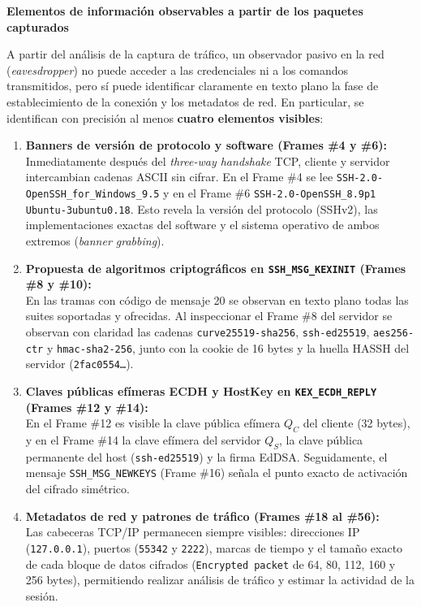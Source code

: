 \documentclass[letter,12pt]{article}
\begin{document}
\vspace{0.3cm}
\noindent\textbf{Elementos de información observables a partir de los paquetes capturados}\par
\vspace{0.15cm}

A partir del análisis de la captura de tráfico, un observador pasivo en la red (\textit{eavesdropper}) no puede acceder a las credenciales ni a los comandos transmitidos, pero sí puede identificar claramente en texto plano la fase de establecimiento de la conexión y los metadatos de red. En particular, se identifican con precisión al menos \textbf{cuatro elementos visibles}:

\begin{enumerate}
    \item \textbf{Banners de versión de protocolo y software (Frames \#4 y \#6):}\\
    Inmediatamente después del \textit{three-way handshake} TCP, cliente y servidor intercambian cadenas ASCII sin cifrar. En el Frame \#4 se lee \texttt{SSH-2.0-OpenSSH\_for\_Windows\_9.5} y en el Frame \#6 \texttt{SSH-2.0-OpenSSH\_8.9p1 Ubuntu-3ubuntu0.18}. Esto revela la versión del protocolo (SSHv2), las implementaciones exactas del software y el sistema operativo de ambos extremos (\textit{banner grabbing}).

    \item \textbf{Propuesta de algoritmos criptográficos en \texttt{SSH\_MSG\_KEXINIT} (Frames \#8 y \#10):}\\
    En las tramas con código de mensaje 20 se observan en texto plano todas las suites soportadas y ofrecidas. Al inspeccionar el Frame \#8 del servidor se observan con claridad las cadenas \texttt{curve25519-sha256}, \texttt{ssh-ed25519}, \texttt{aes256-ctr} y \texttt{hmac-sha2-256}, junto con la cookie de 16 bytes y la huella HASSH del servidor (\texttt{2fac0554\dots}).

    \item \textbf{Claves públicas efímeras ECDH y HostKey en \texttt{KEX\_ECDH\_REPLY} (Frames \#12 y \#14):}\\
    En el Frame \#12 es visible la clave pública efímera $Q_C$ del cliente (32 bytes), y en el Frame \#14 la clave efímera del servidor $Q_S$, la clave pública permanente del host (\texttt{ssh-ed25519}) y la firma EdDSA. Seguidamente, el mensaje \texttt{SSH\_MSG\_NEWKEYS} (Frame \#16) señala el punto exacto de activación del cifrado simétrico.

    \item \textbf{Metadatos de red y patrones de tráfico (Frames \#18 al \#56):}\\
    Las cabeceras TCP/IP permanecen siempre visibles: direcciones IP (\texttt{127.0.0.1}), puertos (\texttt{55342} y \texttt{2222}), marcas de tiempo y el tamaño exacto de cada bloque de datos cifrados (\texttt{Encrypted packet} de 64, 80, 112, 160 y 256 bytes), permitiendo realizar análisis de tráfico y estimar la actividad de la sesión.
\end{enumerate}
\end{document}
